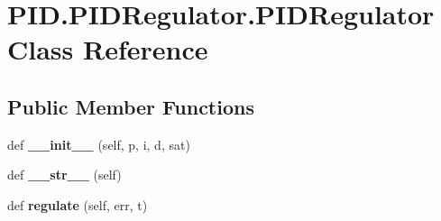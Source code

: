 \hypertarget{classPID_1_1PIDRegulator_1_1PIDRegulator}{}\section{P\+I\+D.\+P\+I\+D\+Regulator.\+P\+I\+D\+Regulator Class Reference}
\label{classPID_1_1PIDRegulator_1_1PIDRegulator}
\subsection*{Public Member Functions}
\begin{DoxyCompactItemize}
\item 
\mbox{\label{classPID_1_1PIDRegulator_1_1PIDRegulator_abf8d015d547f834e2293cd3ca591e3a7}} 
def {\bfseries \+\_\+\+\_\+init\+\_\+\+\_\+} (self, p, i, d, sat)
\item 
\mbox{\label{classPID_1_1PIDRegulator_1_1PIDRegulator_ae4f2b919b19afe0edf9d469cda43d303}} 
def {\bfseries \+\_\+\+\_\+str\+\_\+\+\_\+} (self)
\item 
\mbox{\label{classPID_1_1PIDRegulator_1_1PIDRegulator_a8be4d249b1edaa77e91c0a3d447e8969}} 
def {\bfseries regulate} (self, err, t)
\end{DoxyCompactItemize}
